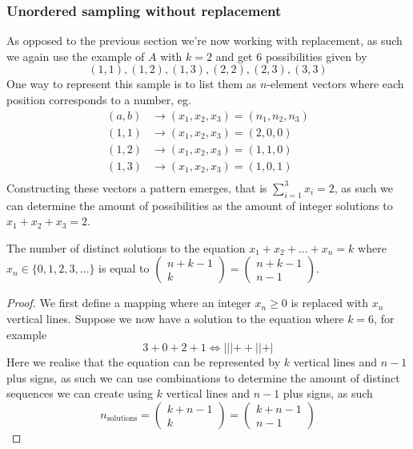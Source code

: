 \subsubsection{Unordered sampling without replacement}
As opposed to the previous section we're now working with replacement, as such we again use the example of $A$ with $k=2$ and get 6 possibilities given by
\[
    (1,1),(1,2),(1,3),(2,2),(2,3),(3,3)
\]
One way to represent this sample is to list them as $n$-element vectors where each position corresponds to a number, eg.
\begin{align*}
    (a,b)&\rightarrow(x_{1},x_{2},x_{3})=(n_{1},n_{2},n_{3}) \\
    (1,1)&\rightarrow(x_{1},x_{2},x_{3})=(2,0,0) \\
    (1,2)&\rightarrow(x_{1},x_{2},x_{3})=(1,1,0) \\
    (1,3)&\rightarrow(x_{1},x_{2},x_{3})=(1,0,1) \\
\end{align*}
Constructing these vectors a pattern emerges, that is $\sum_{i=1}^{3}x_{i}=2$, as such we can determine the amount of possibilities as the amount of integer solutions to $x_{1}+x_{2}+x_{3}=2$.
\begin{theorem}
    The number of distinct solutions to the equation $x_{1}+x_{2}+\ldots+x_{n}=k$ where $x_{n}\in\{0,1,2,3,\ldots\}$ is equal to $\begin{pmatrix}n+k-1\\k\end{pmatrix}=\begin{pmatrix}n+k-1\\n-1\end{pmatrix}$.
\end{theorem}
\begin{proof}
  We first define a mapping where an integer $x_{n}\geq 0$ is replaced with $x_{n}$ vertical lines. Suppose we now have a solution to the equation where $k=6$, for example
  \[
      3+0+2+1\Leftrightarrow |||++||+|
  \]
  Here we realise that the equation can be represented by $k$ vertical lines and $n-1$ plus signs, as such we can use combinations to determine the amount of distinct sequences we can create using $k$ vertical lines and $n-1$ plus signs, as such
  \[
      n_{\text{solutions}}=\begin{pmatrix}k+n-1\\k\end{pmatrix}=\begin{pmatrix}k+n-1\\n-1\end{pmatrix}
  \]
\end{proof}
